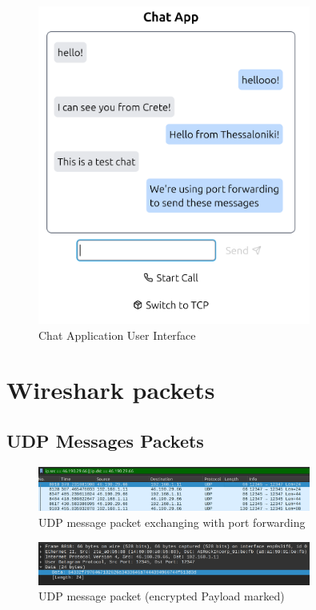\documentclass{article}
\begin{document}
\begin{figure}[h]
    \centering
    \includegraphics[width=0.8\textwidth]{chat1.png}
    \caption{Chat Application User Interface}
    \label{fig:chat1}
\end{figure}

\section{Wireshark packets}

\subsection{UDP Messages Packets}
\begin{figure}[h]
    \centering
    \includegraphics[width=0.8\textwidth]{udp-messages-1.png}
    \caption{UDP message packet exchanging with port forwarding}
    \label{fig:udp-messages-1}
\end{figure}

\begin{figure}[h]
    \centering
    \includegraphics[width=0.8\textwidth]{udp-messages-2.png}
    \caption{UDP message packet (encrypted Payload marked)}
    \label{fig:udp-messages-2}
\end{figure}
\end{document}
